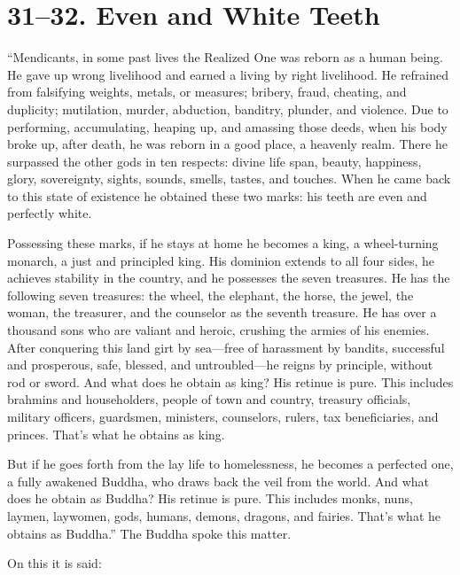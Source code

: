 \documentclass[12pt,openany]{book}%
\begin{document}
\section*{31–32. Even and White Teeth }

“Mendicants, in some past lives the Realized One was reborn as a human being. He gave up wrong livelihood and earned a living by right livelihood. He refrained from falsifying weights, metals, or measures; bribery, fraud, cheating, and duplicity; mutilation, murder, abduction, banditry, plunder, and violence. Due to performing, accumulating, heaping up, and amassing those deeds, when his body broke up, after death, he was reborn in a good place, a heavenly realm. There he surpassed the other gods in ten respects: divine life span, beauty, happiness, glory, sovereignty, sights, sounds, smells, tastes, and touches. When he came back to this state of existence he obtained these two marks: his teeth are even and perfectly white. 

Possessing these marks, if he stays at home he becomes a king, a wheel-turning monarch, a just and principled king. His dominion extends to all four sides, he achieves stability in the country, and he possesses the seven treasures. He has the following seven treasures: the wheel, the elephant, the horse, the jewel, the woman, the treasurer, and the counselor as the seventh treasure. He has over a thousand sons who are valiant and heroic, crushing the armies of his enemies. After conquering this land girt by sea—free of harassment by bandits, successful and prosperous, safe, blessed, and untroubled—he reigns by principle, without rod or sword. And what does he obtain as king? His retinue is pure. This includes brahmins and householders, people of town and country, treasury officials, military officers, guardsmen, ministers, counselors, rulers, tax beneficiaries, and princes. That’s what he obtains as king. 

But if he goes forth from the lay life to homelessness, he becomes a perfected one, a fully awakened Buddha, who draws back the veil from the world. And what does he obtain as Buddha? His retinue is pure. This includes monks, nuns, laymen, laywomen, gods, humans, demons, dragons, and fairies. That’s what he obtains as Buddha.” The Buddha spoke this matter. 

On this it is said: 
\end{document}
